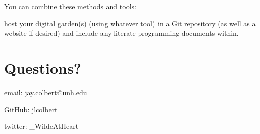 \documentclass[11pt]{article}
\begin{document}
You can combine these methods and tools:

host your digital garden(s) (using whatever tool) in a Git repository (as well as a website if desired) and include any literate programming documents within.

\section*{Questions?}
\label{sec:org3587f19}
email: jay.colbert@unh.edu

GitHub: jlcolbert

twitter: \_WildeAtHeart
\end{document}
